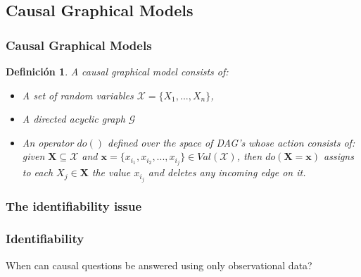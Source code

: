 \documentclass{beamer}
\theoremstyle{plain}
\newtheorem{defi}[teo]{Definición}
\begin{document}
	\subsection{Causal Graphical Models}
	\begin{frame}
	\frametitle{Causal Graphical Models}
	\begin{defi}
	A causal graphical model consists of:
	\begin{itemize}
	 \item A set of random variables $\mathcal{X}=\{ X_1,...,X_n \}$, 
	 \item A directed acyclic graph $\mathcal{G}$
	 \item An operator $do()$ defined over the space of DAG's whose action consists of: given $\mathbf{X} \subseteq \mathcal{X}$ and $\mathbf{x} = \{ x_{i_1}, x_{i_2}, ... , x_{i_j} \} \in Val(\mathcal{X})$, then $do(\mathbf{X} = \mathbf{x} )$ assigns to each $X_j \in \mathbf{X}$ the value $x_{i_j}$ and deletes any incoming edge on it.
	 \end{itemize}
	 \end{defi}
	 \end{frame}
		\subsubsection{The identifiability issue} 
		\begin{frame}
		\frametitle{Identifiability}
		When can causal questions be answered using only observational data?
		\end{frame}
\end{document}
